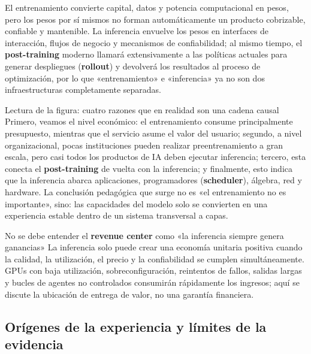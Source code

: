 El entrenamiento convierte capital, datos y potencia computacional en pesos, pero los pesos por sí mismos no forman automáticamente un producto cobrizable, confiable y mantenible. La inferencia envuelve los pesos en interfaces de interacción, flujos de negocio y mecanismos de confiabilidad; al mismo tiempo, el \textbf{post-training} moderno llamará extensivamente a las políticas actuales para generar despliegues (\textbf{rollout}) y devolverá los resultados al proceso de optimización, por lo que «entrenamiento» e «inferencia» ya no son dos infraestructuras completamente separadas.


\begin{knowledgebox}{Lectura de la figura: cuatro razones que en realidad son una cadena causal}
Primero, veamos el nivel económico: el entrenamiento consume principalmente presupuesto, mientras que el servicio asume el valor del usuario; segundo, a nivel organizacional, pocas instituciones pueden realizar preentrenamiento a gran escala, pero casi todos los productos de IA deben ejecutar inferencia; tercero, esta conecta el \textbf{post-training} de vuelta con la inferencia; y finalmente, esto indica que la inferencia abarca aplicaciones, programadores (\textbf{scheduler}), álgebra, red y hardware. La conclusión pedagógica que surge no es «el entrenamiento no es importante», sino: las capacidades del modelo solo se convierten en una experiencia estable dentro de un sistema transversal a capas.
\end{knowledgebox}

\begin{warningbox}{No se debe entender el \textbf{revenue center} como «la inferencia siempre genera ganancias»}
La inferencia solo puede crear una economía unitaria positiva cuando la calidad, la utilización, el precio y la confiabilidad se cumplen simultáneamente. GPUs con baja utilización, sobreconfiguración, reintentos de fallos, salidas largas y bucles de agentes no controlados consumirán rápidamente los ingresos; aquí se discute la ubicación de entrega de valor, no una garantía financiera.
\end{warningbox}

\subsection{Orígenes de la experiencia y límites de la evidencia}


